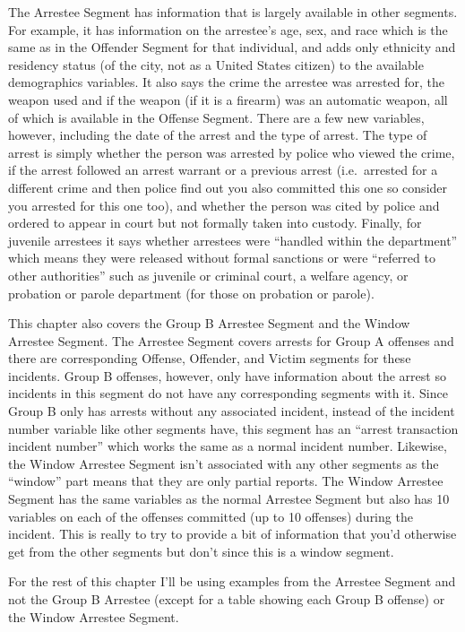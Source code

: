 \documentclass[
  12pt,
  openany]{book}
\begin{document}
The Arrestee Segment has information that is largely available in other segments. For example, it has information on the arrestee's age, sex, and race which is the same as in the Offender Segment for that individual, and adds only ethnicity and residency status (of the city, not as a United States citizen) to the available demographics variables. It also says the crime the arrestee was arrested for, the weapon used and if the weapon (if it is a firearm) was an automatic weapon, all of which is available in the Offense Segment. There are a few new variables, however, including the date of the arrest and the type of arrest. The type of arrest is simply whether the person was arrested by police who viewed the crime, if the arrest followed an arrest warrant or a previous arrest (i.e.~arrested for a different crime and then police find out you also committed this one so consider you arrested for this one too), and whether the person was cited by police and ordered to appear in court but not formally taken into custody. Finally, for juvenile arrestees it says whether arrestees were ``handled within the department'' which means they were released without formal sanctions or were ``referred to other authorities'' such as juvenile or criminal court, a welfare agency, or probation or parole department (for those on probation or parole).

This chapter also covers the Group B Arrestee Segment and the Window Arrestee Segment. The Arrestee Segment covers arrests for Group A offenses and there are corresponding Offense, Offender, and Victim segments for these incidents. Group B offenses, however, only have information about the arrest so incidents in this segment do not have any corresponding segments with it. Since Group B only has arrests without any associated incident, instead of the incident number variable like other segments have, this segment has an ``arrest transaction incident number'' which works the same as a normal incident number. Likewise, the Window Arrestee Segment isn't associated with any other segments as the ``window'' part means that they are only partial reports. The Window Arrestee Segment has the same variables as the normal Arrestee Segment but also has 10 variables on each of the offenses committed (up to 10 offenses) during the incident. This is really to try to provide a bit of information that you'd otherwise get from the other segments but don't since this is a window segment.

For the rest of this chapter I'll be using examples from the Arrestee Segment and not the Group B Arrestee (except for a table showing each Group B offense) or the Window Arrestee Segment.
\end{document}
